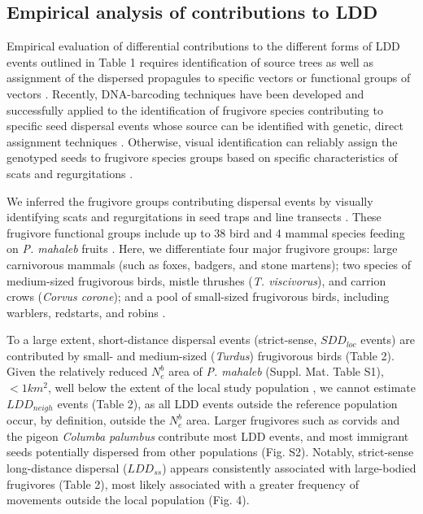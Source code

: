 \documentclass[a4paper, 12pt]{article}
\begin{document}
\begin{linenumbers}
\subsection*{Empirical analysis of contributions to LDD}

Empirical evaluation of differential contributions to the different forms of LDD events outlined in Table 1 requires identification of source trees as well as assignment of the dispersed propagules to specific vectors or functional groups of vectors \citep{Jordano:2007}. Recently, DNA-barcoding techniques have been developed and successfully applied to the identification of frugivore species contributing to specific seed dispersal events whose source can be identified with genetic, direct assignment techniques \citep{GonzalezVaro:2014ij}. Otherwise, visual identification can reliably assign the genotyped seeds to frugivore species groups based on specific characteristics of scats and regurgitations \citep{Jordano:2007}. 

We inferred the frugivore groups contributing dispersal events by visually identifying scats and regurgitations in seed traps and line transects \citep[see ][ and Suppl. Mat. for additional details of methods]{Jordano:2007}. These frugivore functional groups include up to 38 bird and 4 mammal species feeding on \textit{P. mahaleb} fruits \citep{Jordano:2000ft}. Here, we differentiate four major frugivore groups: large carnivorous mammals (such as foxes, badgers, and stone martens); two species of medium-sized frugivorous birds, mistle thrushes (\textit{T. viscivorus}), and carrion crows (\textit{Corvus corone}); and a pool of small-sized frugivorous birds, including warblers, redstarts, and robins \citep{Jordano:2007}.  

To a large extent, short-distance dispersal events (strict-sense, $SDD_{loc}$ events) are contributed by small- and medium-sized (\textit{Turdus}) frugivorous birds (Table 2). Given the relatively reduced $N^b_e$ area of \textit{P. mahaleb} (Suppl. Mat. Table S1), $< 1km^2$, well below the extent of the local study population \citep{Garcia:2007he,Garcia:2005fu}, we cannot estimate $LDD_{neigh}$ events (Table 2), as all LDD events outside the reference population occur, by definition, outside the $N^b_e$ area. Larger frugivores such as corvids and the pigeon \textit{Columba palumbus} contribute most LDD events, and most immigrant seeds potentially dispersed from other populations (Fig. S2). Notably, strict-sense long-distance dispersal ($LDD_{ss}$) appears consistently associated with large-bodied frugivores (Table 2), most likely associated with a greater frequency of movements outside the local population (Fig. 4).


\end{linenumbers}
\end{document}
